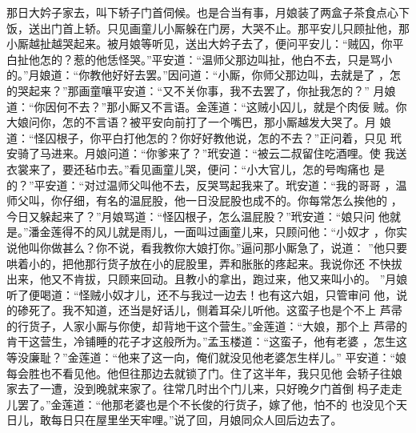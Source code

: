 那日大妗子家去，叫下轿子门首伺候。也是合当有事，月娘装了两盒子茶食点心下
饭，送出门首上轿。只见画童儿小厮躲在门房，大哭不止。那平安儿只顾扯他，那
小厮越扯越哭起来。被月娘等听见，送出大妗子去了，便问平安儿：“贼囚，你平
白扯他怎的？惹的他恁怪哭。”平安道：“温师父那边叫扯，他白不去，只是骂小
的。”月娘道：“你教他好好去罢。”因问道：“小厮，你师父那边叫，去就是了
，怎的哭起来？”那画童嚷平安道：“又不关你事，我不去罢了，你扯我怎的？”
月娘道：“你因何不去？”那小厮又不言语。金莲道：“这贼小囚儿，就是个肉佞
贼。你大娘问你，怎的不言语？被平安向前打了一个嘴巴，那小厮越发大哭了。月
娘道：“怪囚根子，你平白打他怎的？你好好教他说，怎的不去？”正问着，只见
玳安骑了马进来。月娘问道：“你爹来了？”玳安道：“被云二叔留住吃酒哩。使
我送衣裳来了，要还毡巾去。”看见画童儿哭，便问：“小大官儿，怎的号啕痛也
是的？”平安道：“对过温师父叫他不去，反哭骂起我来了。玳安道：“我的哥哥
，温师父叫，你仔细，有名的温屁股，他一日没屁股也成不的。你每常怎么挨他的
，今日又躲起来了？”月娘骂道：“怪囚根子，怎么温屁股？”玳安道：“娘只问
他就是。”潘金莲得不的风儿就是雨儿，一面叫过画童儿来，只顾问他：“小奴才
，你实说他叫你做甚么？你不说，看我教你大娘打你。”逼问那小厮急了，说道：
”他只要哄着小的，把他那行货子放在小的屁股里，弄和胀胀的疼起来。我说你还
不快拔出来，他又不肯拔，只顾来回动。且教小的拿出，跑过来，他又来叫小的。
”月娘听了便喝道：“怪贼小奴才儿，还不与我过一边去！也有这六姐，只管审问
他，说的碜死了。我不知道，还当是好话儿，侧着耳朵儿听他。这蛮子也是个不上
芦帚的行货子，人家小厮与你使，却背地干这个营生。”金莲道：“大娘，那个上
芦帚的肯干这营生，冷铺睡的花子才这般所为。”孟玉楼道：“这蛮子，他有老婆
，怎生这等没廉耻？”金莲道：“他来了这一向，俺们就没见他老婆怎生样儿。”
平安道：“娘每会胜也不看见他。他但往那边去就锁了门。住了这半年，我只见他
会轿子往娘家去了一遭，没到晚就来家了。往常几时出个门儿来，只好晚夕门首倒
杩子走走儿罢了。”金莲道：“他那老婆也是个不长俊的行货子，嫁了他，怕不的
也没见个天日儿，敢每日只在屋里坐天牢哩。”说了回，月娘同众人回后边去了。

